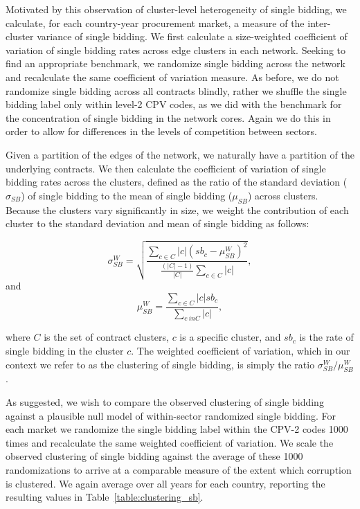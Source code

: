 Motivated by this observation of cluster-level heterogeneity of single bidding, we calculate, for each country-year procurement market, a measure of the inter-cluster variance of single bidding. We first calculate a size-weighted coefficient of variation of single bidding rates across edge clusters in each network. Seeking to find an appropriate benchmark, we randomize single bidding across the network and recalculate the same coefficient of variation measure. As before, we do not randomize single bidding across all contracts blindly, rather we shuffle the single bidding label only within level-2 CPV codes, as we did with the benchmark for the concentration of single bidding in the network cores. Again we do this in order to allow for differences in the levels of competition between sectors.

Given a partition of the edges of the network, we naturally have a partition of the underlying contracts. We then calculate the coefficient of variation of single bidding rates across the clusters, defined as the ratio of the standard deviation ($\sigma_{SB}$) of single bidding to the mean of single bidding ($\mu_{SB}$) across clusters. Because the clusters vary significantly in size, we weight the contribution of each cluster to the standard deviation and mean of single bidding as follows:


$$\sigma^{W}_{SB} = \sqrt{ \frac{ \sum_{c\in C} |c| (sb_{c} - \mu^{W}_{SB})^2 }{ \frac{(|C|-1)}{|C|} \sum_{c\in C} |c| } },$$
and
$$\mu^{W}_{SB} =  \frac{\sum_{c \in C} |c| sb_{c}}{\sum_{c \ in C} |c|},$$

\noindent where $C$ is the set of contract clusters, $c$ is a specific cluster, and $sb_{c}$ is the rate of single bidding in the cluster $c$. The weighted coefficient of variation, which in our context we refer to as the clustering of single bidding, is simply the ratio $\sigma^{W}_{SB}/\mu^{W}_{SB}$.

As suggested, we wish to compare the observed clustering of single bidding against a plausible null model of within-sector randomized single bidding. For each market we randomize the single bidding label within the CPV-2 codes 1000 times and recalculate the same weighted coefficient of variation. We scale the observed clustering of single bidding against the average of these 1000 randomizations to arrive at a comparable measure of the extent which corruption is clustered. We again average over all years for each country, reporting the resulting values in Table~\ref{table:clustering_sb}. 


